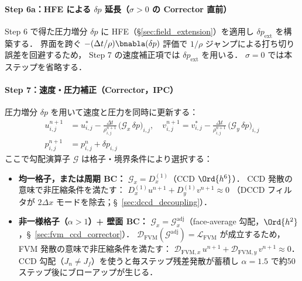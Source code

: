 \begin{tcolorbox}[algbox, title={1 タイムステップ $t^n \to t^{n+1}$ の完全アルゴリズム}]
\paragraph{Step 6a：HFE による $\delta p$ 延長（$\sigma>0$ の Corrector 直前）}
Step 6 で得た圧力増分 $\delta p$ に HFE（§\ref{sec:field_extension}）を適用し
$\delta p_{\mathrm{ext}}$ を構築する．
界面を跨ぐ $-(\Delta t/\rho)\bnabla(\delta p)$ 評価で
$1/\rho$ ジャンプによる打ち切り誤差を回避するため，
Step 7 の速度補正項では $\delta p_{\mathrm{ext}}$ を用いる．
$\sigma=0$ では本ステップを省略する．

\paragraph{Step 7：速度・圧力補正（Corrector，IPC）}
\label{box:fvm_ccd_metric}
圧力増分 $\delta p$ を用いて速度と圧力を同時に更新する：
\begin{align*}
u^{n+1}_{i,j} &= u^*_{i,j}
  - \frac{\Delta t}{\rho^{n+1}_{i,j}}\,\bigl(\mathcal{G}_x \,\delta p\bigr)_{i,j}, \quad
v^{n+1}_{i,j} = v^*_{i,j}
  - \frac{\Delta t}{\rho^{n+1}_{i,j}}\,\bigl(\mathcal{G}_y \,\delta p\bigr)_{i,j} \\
p^{n+1}_{i,j} &= p^n_{i,j} + \delta p_{i,j}
\end{align*}
ここで勾配演算子 $\mathcal{G}$ は格子・境界条件により選択する：
\begin{itemize}[noitemsep]
  \item \textbf{均一格子，または周期 BC：}
        $\mathcal{G}_x = D_x^{(1)}$（CCD $\Ord{h^6}$）．
        CCD 発散の意味で非圧縮条件を満たす：
        $D_x^{(1)} u^{n+1} + D_y^{(1)} v^{n+1} \approx 0$
        （DCCD フィルタが $2\Delta x$ モードを除去；§~\ref{sec:dccd_decoupling}）．
  \item \textbf{非一様格子（$\alpha>1$）+ 壁面 BC：}
        $\mathcal{G}_x = \mathcal{G}_x^\text{adj}$（face-average 勾配，$\Ord{h^2}$，§~\ref{sec:fvm_ccd_corrector}）．
        $\mathcal{D}_\text{FVM}(\mathcal{G}^\text{adj}) = \mathcal{L}_\text{FVM}$ が成立するため，
        FVM 発散の意味で非圧縮条件を満たす：
        $\mathcal{D}_{\text{FVM},x}\, u^{n+1} + \mathcal{D}_{\text{FVM},y}\, v^{n+1} \approx 0$．
        CCD 勾配（$J_n \neq J_f$）を使うと毎ステップ残差発散が蓄積し
        $\alpha=1.5$ で約50ステップ後にブローアップが生じる．
\end{itemize}
\end{tcolorbox}
